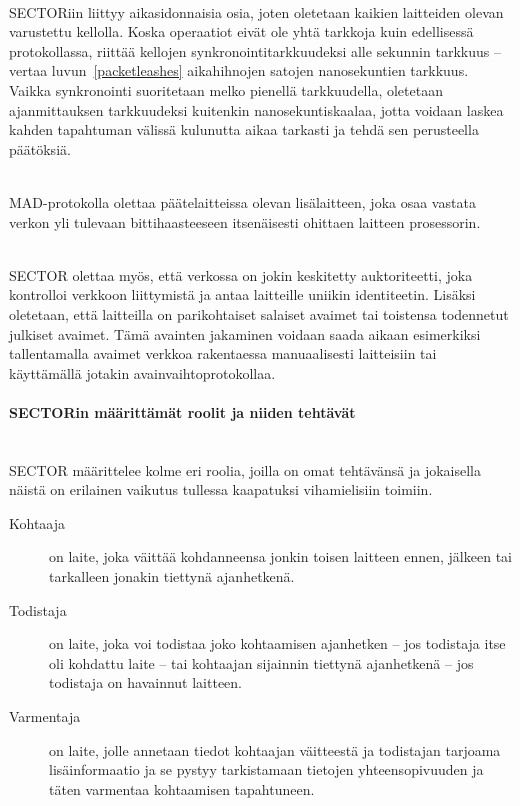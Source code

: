 \documentclass[finnish]{tktltiki2}
\theoremstyle{definition}
\theoremstyle{remark}
\begin{document}
\noindent \\
SECTORiin liittyy aikasidonnaisia osia, joten oletetaan kaikien laitteiden olevan varustettu kellolla. Koska operaatiot eivät ole yhtä tarkkoja kuin edellisessä protokollassa, riittää kellojen synkronointitarkkuudeksi alle sekunnin tarkkuus -- vertaa luvun~\ref{packetleashes} aikahihnojen satojen nanosekuntien tarkkuus. Vaikka synkronointi suoritetaan melko pienellä tarkkuudella, oletetaan ajanmittauksen tarkkuudeksi kuitenkin nanosekuntiskaalaa, jotta voidaan laskea kahden tapahtuman välissä kulunutta aikaa tarkasti ja tehdä sen perusteella päätöksiä.

\noindent\\
MAD-protokolla olettaa päätelaitteissa olevan lisälaitteen, joka osaa vastata verkon yli tulevaan bittihaasteeseen itsenäisesti ohittaen laitteen prosessorin.

\noindent\\
SECTOR olettaa myös, että verkossa on jokin keskitetty auktoriteetti, joka kontrolloi verkkoon liittymistä ja antaa laitteille uniikin identiteetin. Lisäksi oletetaan, että laitteilla on parikohtaiset salaiset avaimet tai toistensa todennetut julkiset avaimet. Tämä avainten jakaminen voidaan saada aikaan esimerkiksi tallentamalla avaimet verkkoa rakentaessa manuaalisesti laitteisiin tai käyttämällä jotakin avainvaihtoprotokollaa.

\paragraph{SECTORin määrittämät roolit ja niiden tehtävät}
\label{sector-roles}
\noindent\\
SECTOR määrittelee kolme eri roolia, joilla on omat tehtävänsä ja jokaisella näistä on erilainen vaikutus tullessa kaapatuksi vihamielisiin toimiin.

\begin{description}
\item[Kohtaaja] on laite, joka väittää kohdanneensa jonkin toisen laitteen ennen, jälkeen tai tarkalleen jonakin tiettynä ajanhetkenä.
\item[Todistaja] on laite, joka voi todistaa joko kohtaamisen ajanhetken -- jos todistaja itse oli kohdattu laite -- tai kohtaajan sijainnin tiettynä ajanhetkenä -- jos todistaja on havainnut laitteen.
\item[Varmentaja] on laite, jolle annetaan tiedot kohtaajan väitteestä ja todistajan tarjoama lisäinformaatio ja se pystyy tarkistamaan tietojen yhteensopivuuden ja täten varmentaa kohtaamisen tapahtuneen.
\end{description}
\end{document}
